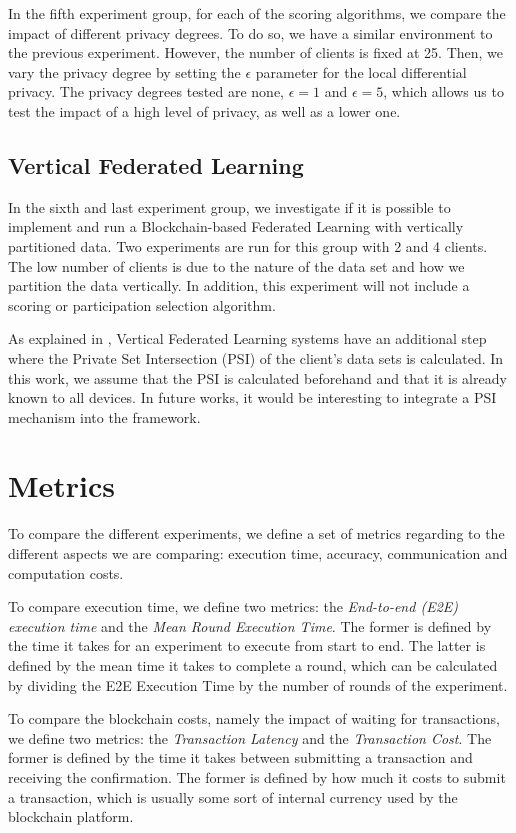 In the fifth experiment group, for each of the scoring algorithms, we compare the impact of different privacy degrees. To do so, we have a similar environment to the previous experiment. However, the number of clients is fixed at 25. Then, we vary the privacy degree by setting the $\epsilon$ parameter for the local differential privacy. The privacy degrees tested are none, $\epsilon = 1$ and $\epsilon = 5$, which allows us to test the impact of a high level of privacy, as well as a lower one.

\subsection{Vertical Federated Learning}

In the sixth and last experiment group, we investigate if it is possible to implement and run a Blockchain-based Federated Learning with vertically partitioned data. Two experiments are run for this group with 2 and 4 clients. The low number of clients is due to the nature of the data set and how we partition the data vertically. In addition, this experiment will not include a scoring or participation selection algorithm.

As explained in , Vertical Federated Learning systems have an additional step where the Private Set Intersection (PSI) of the client's data sets is calculated. In this work, we assume that the PSI is calculated beforehand and that it is already known to all devices. In future works, it would be interesting to integrate a PSI mechanism into the framework.

\section{Metrics}\label{meth:metrics}

To compare the different experiments, we define a set of metrics regarding to the different aspects we are comparing: execution time, accuracy, communication and computation costs.

To compare execution time, we define two metrics: the \textit{End-to-end (E2E) execution time} and the \textit{Mean Round Execution Time}. The former is defined by the time it takes for an experiment to execute from start to end. The latter is defined by the mean time it takes to complete a round, which can be calculated by dividing the E2E Execution Time by the number of rounds of the experiment.

To compare the blockchain costs, namely the impact of waiting for transactions, we define two metrics: the \textit{Transaction Latency} and the \textit{Transaction Cost}. The former is defined by the time it takes between submitting a transaction and receiving the confirmation. The former is defined by how much it costs to submit a transaction, which is usually some sort of internal currency used by the blockchain platform.

